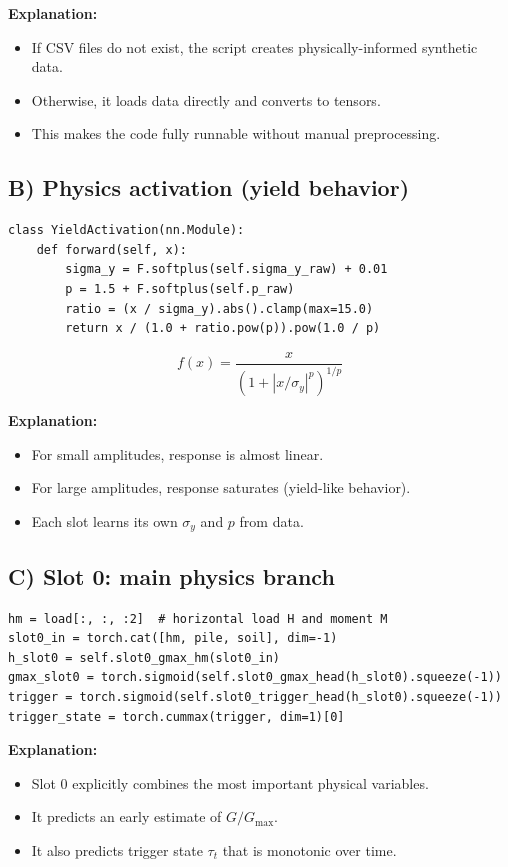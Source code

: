 \documentclass[12pt,a4paper]{article}
\begin{document}
\textbf{Explanation:}
\begin{itemize}
  \item If CSV files do not exist, the script creates physically-informed synthetic data.
  \item Otherwise, it loads data directly and converts to tensors.
  \item This makes the code fully runnable without manual preprocessing.
\end{itemize}

\subsection{B) Physics activation (yield behavior)}

\begin{lstlisting}[caption=YieldActivation]
class YieldActivation(nn.Module):
    def forward(self, x):
        sigma_y = F.softplus(self.sigma_y_raw) + 0.01
        p = 1.5 + F.softplus(self.p_raw)
        ratio = (x / sigma_y).abs().clamp(max=15.0)
        return x / (1.0 + ratio.pow(p)).pow(1.0 / p)
\end{lstlisting}

\[
f(x)=\frac{x}{\left(1+|x/\sigma_y|^p\right)^{1/p}}
\]

\textbf{Explanation:}
\begin{itemize}
  \item For small amplitudes, response is almost linear.
  \item For large amplitudes, response saturates (yield-like behavior).
  \item Each slot learns its own $\sigma_y$ and $p$ from data.
\end{itemize}

\subsection{C) Slot 0: main physics branch}

\begin{lstlisting}[caption=Slot 0 branch]
hm = load[:, :, :2]  # horizontal load H and moment M
slot0_in = torch.cat([hm, pile, soil], dim=-1)
h_slot0 = self.slot0_gmax_hm(slot0_in)
gmax_slot0 = torch.sigmoid(self.slot0_gmax_head(h_slot0).squeeze(-1))
trigger = torch.sigmoid(self.slot0_trigger_head(h_slot0).squeeze(-1))
trigger_state = torch.cummax(trigger, dim=1)[0]
\end{lstlisting}

\textbf{Explanation:}
\begin{itemize}
  \item Slot 0 explicitly combines the most important physical variables.
  \item It predicts an early estimate of $G/G_{\max}$.
  \item It also predicts trigger state $\tau_t$ that is monotonic over time.
\end{itemize}
\end{document}
